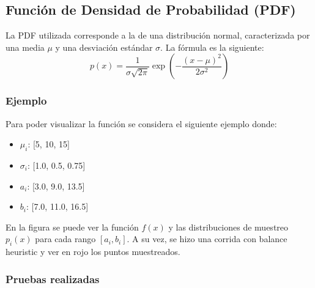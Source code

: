 \documentclass{article}
\begin{document}
\subsection{Función de Densidad de Probabilidad (PDF)}
La PDF utilizada corresponde a la de una distribución normal, caracterizada por una media \( \mu \) y una desviación estándar \( \sigma \). La fórmula es la siguiente:
\begin{equation}
p(x) = \frac{1}{\sigma \sqrt{2\pi}} \exp\left(-\frac{(x - \mu)^2}{2\sigma^2}\right)
\end{equation}

\subsubsection*{Ejemplo}

Para poder visualizar la función se considera el siguiente ejemplo donde:

\begin{itemize}
    \item \textbf{\( \mu_{i} \)}: [5, 10, 15]
    \item \textbf{\( \sigma_{i} \)}: [1.0, 0.5, 0.75]
    \item \textbf{\( a_{i} \)}: [3.0, 9.0, 13.5]
    \item \textbf{\( b_{i} \)}: [7.0, 11.0, 16.5]
\end{itemize}

En la figura se puede ver la función \( f(x) \) y las distribuciones de muestreo \( p_{i}(x) \) para cada rango \( [a_{i}, b_{i}] \).
A su vez, se hizo una corrida con balance heuristic y ver en rojo los puntos muestreados.

\subsubsection*{Pruebas realizadas}
\end{document}
